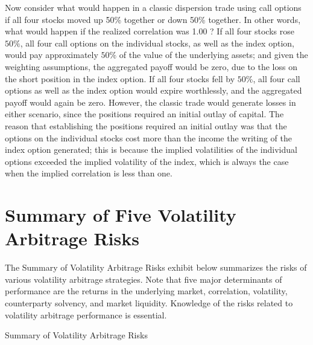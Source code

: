 \documentclass[11pt]{article}
\begin{document}
Now consider what would happen in a classic dispersion trade using call options if all four stocks moved up 50\% together or down 50\% together. In other words, what would happen if the realized correlation was 1.00 ? If all four stocks rose $50 \%$, all four call options on the individual stocks, as well as the index option, would pay approximately $50 \%$ of the value of the underlying assets; and given the weighting assumptions, the aggregated payoff would be zero, due to the loss on the short position in the index option. If all four stocks fell by $50 \%$, all four call options as well as the index option would expire worthlessly, and the aggregated payoff would again be zero. However, the classic trade would generate losses in either scenario, since the positions required an initial outlay of capital. The reason that establishing the positions required an initial outlay was that the options on the individual stocks cost more than the income the writing of the index option generated; this is because the implied volatilities of the individual options exceeded the implied volatility of the index, which is always the case when the implied correlation is less than one.

\section*{Summary of Five Volatility Arbitrage Risks}
The Summary of Volatility Arbitrage Risks exhibit below summarizes the risks of various volatility arbitrage strategies. Note that five major determinants of performance are the returns in the underlying market, correlation, volatility, counterparty solvency, and market liquidity. Knowledge of the risks related to volatility arbitrage performance is essential.

Summary of Volatility Arbitrage Risks
\end{document}

